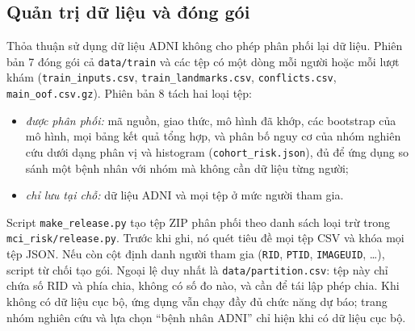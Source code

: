 \documentclass[journal]{IEEEtran}
\newcommand{\code}[1]{\texttt{#1}}
\begin{document}
\subsection{Quản trị dữ liệu và đóng gói}\label{sec:release}
Thỏa thuận sử dụng dữ liệu ADNI không cho phép phân phối lại dữ liệu. Phiên bản 7 đóng gói cả \code{data/train} và các tệp có một dòng mỗi người hoặc mỗi lượt khám (\code{train\_inputs.csv}, \code{train\_landmarks.csv}, \code{conflicts.csv}, \code{main\_oof.csv.gz}). Phiên bản 8 tách hai loại tệp:
\begin{itemize}
\item \emph{được phân phối:} mã nguồn, giao thức, mô hình đã khớp, các bootstrap của mô hình, mọi bảng kết quả tổng hợp, và phân bố nguy cơ của nhóm nghiên cứu dưới dạng phân vị và histogram (\code{cohort\_risk.json}), đủ để ứng dụng so sánh một bệnh nhân với nhóm mà không cần dữ liệu từng người;
\item \emph{chỉ lưu tại chỗ:} dữ liệu ADNI và mọi tệp ở mức người tham gia.
\end{itemize}
Script \code{make\_release.py} tạo tệp ZIP phân phối theo danh sách loại trừ trong \code{mci\_risk/release.py}. Trước khi ghi, nó quét tiêu đề mọi tệp CSV và khóa mọi tệp JSON. Nếu còn cột định danh người tham gia (\code{RID}, \code{PTID}, \code{IMAGEUID}, \ldots), script từ chối tạo gói. Ngoại lệ duy nhất là \code{data/partition.csv}: tệp này chỉ chứa số RID và phía chia, không có số đo nào, và cần để tái lập phép chia. Khi không có dữ liệu cục bộ, ứng dụng vẫn chạy đầy đủ chức năng dự báo; trang nhóm nghiên cứu và lựa chọn ``bệnh nhân ADNI'' chỉ hiện khi có dữ liệu cục bộ.
\end{document}
